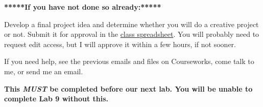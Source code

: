 \documentclass[11pt]{article}%
\begin{document}
\bigskip


\begin{center}
    {\Large{\textbf{*****If you have not done so already:*****}}} \\
    
     \bigskip
    
     \Large{Develop a final project idea and determine whether you will do a creative project or not. Submit it for approval in the \href{https://docs.google.com/spreadsheets/d/1pQL9EKsNcH44vz1XoKthK_Kj-6gCoj2f-hyi6Vgz924/edit?usp=sharing}{class spreadsheet}. You will probably need to request edit access, but I will approve it within a few hours, if not sooner.}

     \Large{If you need help, see the previous emails and files on Courseworks, come talk to me, or send me an email.}

     \bigskip

     \Large{\textbf{This \textit{MUST} be completed before our next lab. You will be unable to complete Lab 9 without this.}}
\end{center}
\end{document}
